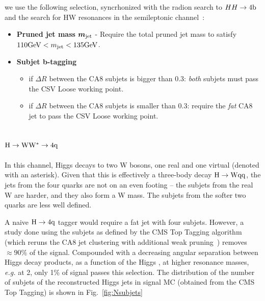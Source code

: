  we use the following selection, syncrhonized with
the radion search to $HH \to {\rm 4b}$~\cite{HH4b} and the search for HW 
resonances in the semileptonic channel~\cite{HWlv}:
\begin{itemize}

\item {\bf Pruned jet mass}  $\mbox{\boldmath$m_{\text{jet}}$}$
  - Require the total pruned jet mass to satisfy $110 \mathrm{GeV} < m_\text{jet} <  135 \mathrm{GeV} $.

\item {\bf Subjet b-tagging}
        \begin{itemize}
	\item if $\Delta R$ between the CA8 subjets is bigger than 0.3: 
  		{\it both} subjets must pass the CSV Loose working point.
	\item if $\Delta R$ between the CA8 subjets is smaller than 0.3:
		require the {\it fat} CA8 jet to pass the CSV Loose working point. 
        \end{itemize}

\end{itemize}



\subsection{${\rm H \to WW^* \to 4q}$}
\label{sec:higgsTaggerww}


In this channel, Higgs decays to two W bosons, one real and one
virtual (denoted with an asterisk).  Given that this is effectively a
three-body decay ${\rm H\to Wqq}$, the jets from the four quarks are
not on an even footing -- the subjets from the real W are harder, and
they also form a W mass.  The subjets from the softer two quarks are
less well defined.

A naive ${\rm H \to 4q}$ tagger would require a fat jet with four subjets. 
However, a study done using the subjets as defined by the CMS Top Tagging
algorithm (which reruns the CA8 jet clustering with additional weak 
pruning~\cite{cmstoptagging}) removes $\approx 90\%$ of the signal.   
Compounded with a decreasing angular separation
between Higgs decay products, 
 as a function of the Higgs \pt, at higher 
resonance masses, {\it e.g.} at 2\TeVcc, only 1\% of signal 
passes this selection. 
The distribution of the number of subjets of the reconstructed Higgs jets 
in signal MC (obtained from the CMS Top Tagging) is shown 
in Fig.~\ref{fig:Nsubjets}

